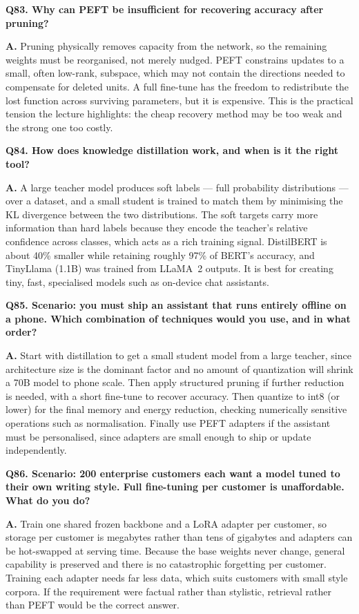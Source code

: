 \documentclass[11pt]{article}
\begin{document}
\medskip
\noindent\textbf{Q83. Why can PEFT be insufficient for recovering accuracy after pruning?}

\noindent\textbf{A.} Pruning physically removes capacity from the network, so the remaining weights must be reorganised, not merely nudged. PEFT constrains updates to a small, often low-rank, subspace, which may not contain the directions needed to compensate for deleted units. A full fine-tune has the freedom to redistribute the lost function across surviving parameters, but it is expensive. This is the practical tension the lecture highlights: the cheap recovery method may be too weak and the strong one too costly.

\medskip
\noindent\textbf{Q84. How does knowledge distillation work, and when is it the right tool?}

\noindent\textbf{A.} A large teacher model produces soft labels --- full probability distributions --- over a dataset, and a small student is trained to match them by minimising the KL divergence between the two distributions. The soft targets carry more information than hard labels because they encode the teacher's relative confidence across classes, which acts as a rich training signal. DistilBERT is about 40\% smaller while retaining roughly 97\% of BERT's accuracy, and TinyLlama (1.1B) was trained from LLaMA~2 outputs. It is best for creating tiny, fast, specialised models such as on-device chat assistants.

\medskip
\noindent\textbf{Q85. Scenario: you must ship an assistant that runs entirely offline on a phone. Which combination of techniques would you use, and in what order?}

\noindent\textbf{A.} Start with distillation to get a small student model from a large teacher, since architecture size is the dominant factor and no amount of quantization will shrink a 70B model to phone scale. Then apply structured pruning if further reduction is needed, with a short fine-tune to recover accuracy. Then quantize to int8 (or lower) for the final memory and energy reduction, checking numerically sensitive operations such as normalisation. Finally use PEFT adapters if the assistant must be personalised, since adapters are small enough to ship or update independently.

\medskip
\noindent\textbf{Q86. Scenario: 200 enterprise customers each want a model tuned to their own writing style. Full fine-tuning per customer is unaffordable. What do you do?}

\noindent\textbf{A.} Train one shared frozen backbone and a LoRA adapter per customer, so storage per customer is megabytes rather than tens of gigabytes and adapters can be hot-swapped at serving time. Because the base weights never change, general capability is preserved and there is no catastrophic forgetting per customer. Training each adapter needs far less data, which suits customers with small style corpora. If the requirement were factual rather than stylistic, retrieval rather than PEFT would be the correct answer.
\end{document}
